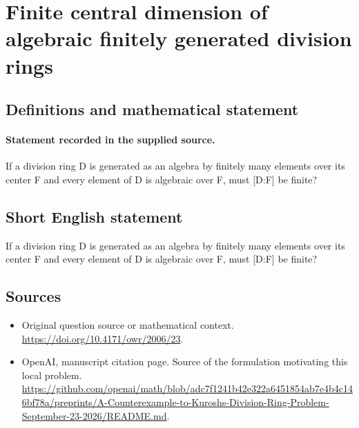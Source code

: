 \documentclass[11pt]{article}
\begin{document}
\section*{Finite central dimension of algebraic finitely generated division rings}\label{statement}
\subsection{Definitions and mathematical statement}
\paragraph{Statement recorded in the supplied source.}
If a division ring D is generated as an algebra by finitely many elements over its center F and every element of D is algebraic over F, must [D:F] be finite?
\subsection{Short English statement}
If a division ring D is generated as an algebra by finitely many elements over its center F and every element of D is algebraic over F, must [D:F] be finite?
\subsection{Sources}
\begin{itemize}
\item[S1] Original question source or mathematical context.
\url{https://doi.org/10.4171/owr/2006/23}.
\item[S2] OpenAI, manuscript citation page. Source of the formulation motivating this local problem.
\url{https://github.com/openai/math/blob/adc7f1241b42e322a6451854ab7e4b4c146bf78a/preprints/A-Counterexample-to-Kuroshs-Division-Ring-Problem-September-23-2026/README.md}.
\end{itemize}
\end{document}
